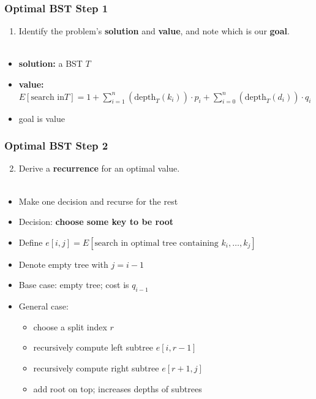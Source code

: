 \documentclass[10pt,aspectratio=169]{beamer}
\newcommand{\stanza}{ \\~\ }
\begin{document}
  \begin{frame} \frametitle{Optimal BST Step 1}
    \begin{enumerate}
      \item Identify the problem's \textbf{solution} and \textbf{value}, and note which is our \textbf{goal}.
      \stanza
    \end{enumerate}

    \begin{itemize}
      \item \textbf{solution:} a BST $T$
      \item \textbf{value:}
      $E[\text{search in} T] = 1 + \sum_{i=1}^n (\text{depth}_T(k_i)) \cdot p_i + \sum_{i=0}^n (\text{depth}_T(d_i)) \cdot q_i $
      \item goal is value
    \end{itemize}
  \end{frame}
  
\begin{frame} \frametitle{Optimal BST Step 2}
  \begin{enumerate}
    \setcounter{enumi}{1}
    \item Derive a \textbf{recurrence} for an optimal value.
    \stanza
  \end{enumerate}
  \begin{itemize}
    \item Make one decision and recurse for the rest
    \item Decision: \textbf{choose some key to be root}
    \item Define $e[i, j] = E[\text{search in optimal tree containing } k_i, \ldots, k_j ]$
    \item Denote empty tree with $j=i-1$
    \item Base case: empty tree; cost is $q_{i-1}$
    \item General case:
      \begin{itemize}
        \item choose a split index $r$
        \item recursively compute left subtree $e[i, r-1]$
        \item recursively compute right subtree $e[r+1, j]$
        \item add root on top; increases depths of subtrees
      \end{itemize}
  \end{itemize}
\end{frame}
\end{document}
